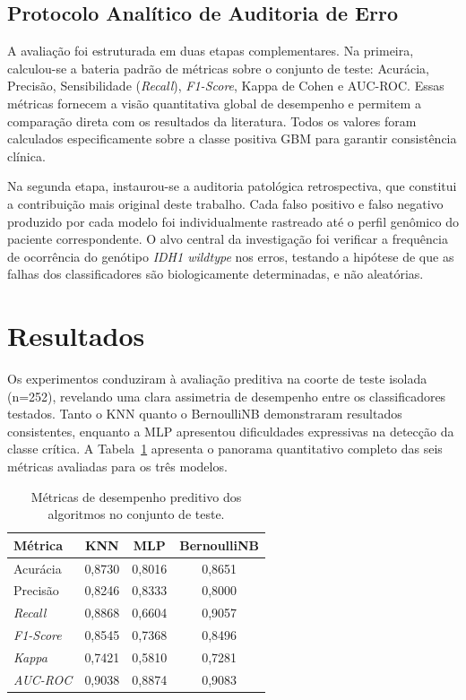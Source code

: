 \documentclass[12pt]{article}
\begin{document}
\subsection{Protocolo Analítico de Auditoria de Erro}
A avaliação foi estruturada em duas etapas complementares. Na primeira, calculou-se a bateria padrão de métricas sobre o conjunto de teste: Acurácia, Precisão, Sensibilidade (\textit{Recall}), \textit{F1-Score}, Kappa de Cohen e AUC-ROC. Essas métricas fornecem a visão quantitativa global de desempenho e permitem a comparação direta com os resultados da literatura. Todos os valores foram calculados especificamente sobre a classe positiva GBM para garantir consistência clínica.

Na segunda etapa, instaurou-se a auditoria patológica retrospectiva, que constitui a contribuição mais original deste trabalho. Cada falso positivo e falso negativo produzido por cada modelo foi individualmente rastreado até o perfil genômico do paciente correspondente. O alvo central da investigação foi verificar a frequência de ocorrência do genótipo \textit{IDH1 wildtype} nos erros, testando a hipótese de que as falhas dos classificadores são biologicamente determinadas, e não aleatórias.

\section{Resultados}
\label{sec:resultados}

Os experimentos conduziram à avaliação preditiva na coorte de teste isolada (n=252), revelando uma clara assimetria de desempenho entre os classificadores testados. Tanto o KNN quanto o BernoulliNB demonstraram resultados consistentes, enquanto a MLP apresentou dificuldades expressivas na detecção da classe crítica. A Tabela~\ref{tab:resultados_metricas} apresenta o panorama quantitativo completo das seis métricas avaliadas para os três modelos.

\begin{table}[!htb]
    \centering
    \caption{Métricas de desempenho preditivo dos algoritmos no conjunto de teste.}
    \label{tab:resultados_metricas}
    \vspace{0.2cm}
    \begin{tabular}{lccc}
        \hline
        \textbf{Métrica}  & \textbf{KNN} & \textbf{MLP} & \textbf{BernoulliNB} \\
        \hline
        Acurácia & 0,8730 & 0,8016 & 0,8651 \\
        Precisão & 0,8246 & 0,8333 & 0,8000 \\
        \textit{Recall} & 0,8868 & 0,6604 & 0,9057 \\
        \textit{F1-Score} & 0,8545 & 0,7368 & 0,8496 \\
        \textit{Kappa} & 0,7421 & 0,5810 & 0,7281 \\
        \textit{AUC-ROC} & 0,9038 & 0,8874 & 0,9083 \\
        \hline
    \end{tabular}
\end{table}
\end{document}
